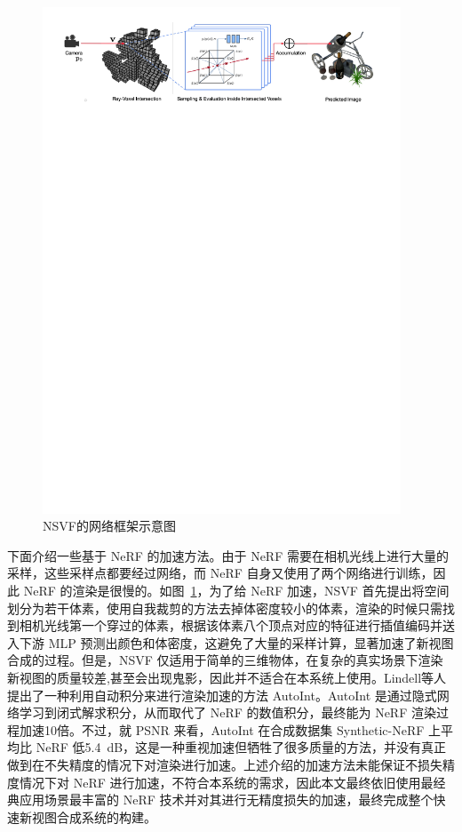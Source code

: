 \begin{figure}[htb]
	\centering
	\includegraphics[width=0.95\textwidth]{figures/NSVF.pdf}
	\caption{NSVF\cite{liu2020neural}的网络框架示意图}
	\label{fig:nsvf}
\end{figure}
\pagebreak
下面介绍一些基于 NeRF 的加速方法。由于 NeRF 需要在相机光线上进行大量的采样，这些采样点都要经过网络，而 NeRF 自身又使用了两个网络进行训练，因此 NeRF 的渲染是很慢的。如图~\ref{fig:nsvf}，为了给 NeRF 加速，NSVF\cite{liu2020neural} 首先提出将空间划分为若干体素，使用自我裁剪的方法去掉体密度较小的体素，渲染的时候只需找到相机光线第一个穿过的体素，根据该体素八个顶点对应的特征进行插值编码并送入下游 MLP 预测出颜色和体密度，这避免了大量的采样计算，显著加速了新视图合成的过程。但是，NSVF 仅适用于简单的三维物体，在复杂的真实场景下渲染新视图的质量较差,甚至会出现鬼影，因此并不适合在本系统上使用。Lindell等人\cite{lindell2020autoint}提出了一种利用自动积分来进行渲染加速的方法 AutoInt。AutoInt 是通过隐式网络学习到闭式解求积分，从而取代了 NeRF 的数值积分，最终能为 NeRF 渲染过程加速10倍。不过，就 PSNR 来看，AutoInt 在合成数据集 Synthetic-NeRF 上平均比 NeRF 低\SI{5.4}{dB}，这是一种重视加速但牺牲了很多质量的方法，并没有真正做到在不失精度的情况下对渲染进行加速。上述介绍的加速方法未能保证不损失精度情况下对 NeRF 进行加速，不符合本系统的需求，因此本文最终依旧使用最经典应用场景最丰富的 NeRF 技术并对其进行无精度损失的加速，最终完成整个快速新视图合成系统的构建。

